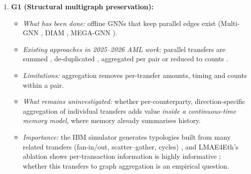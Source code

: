 \documentclass[11pt,a4paper]{article}
\begin{document}
\begin{enumerate}[leftmargin=*]
    \item \textbf{G1 (Structural multigraph preservation):}
    \begin{itemize}[leftmargin=*]
        \item \textit{What has been done:} offline GNNs that keep parallel edges exist (Multi-GNN \cite{egressy2024multigraph}, DIAM \cite{ding2024diam}, MEGA-GNN \cite{bilgi2026mega}).
        \item \textit{Existing approaches in 2025--2026 AML work:} parallel transfers are summed \cite{tian2025kar}, de-duplicated \cite{alemari2026explainable}, aggregated per pair \cite{rico2026taml} or reduced to counts \cite{jia2025lmae4eth}.
        \item \textit{Limitations:} aggregation removes per-transfer amounts, timing and counts within a pair.
        \item \textit{What remains uninvestigated:} whether per-counterparty, direction-specific aggregation of individual transfers adds value \emph{inside a continuous-time memory model}, where memory already summarises history.
        \item \textit{Importance:} the IBM simulator generates typologies built from many related transfers (fan-in/out, scatter--gather, cycles) \cite{altman2023ibmaml}, and LMAE4Eth's ablation shows per-transaction information is highly informative \cite{jia2025lmae4eth}; whether this transfers to graph aggregation is an empirical question.
    \end{itemize}


\end{enumerate}
\end{document}
